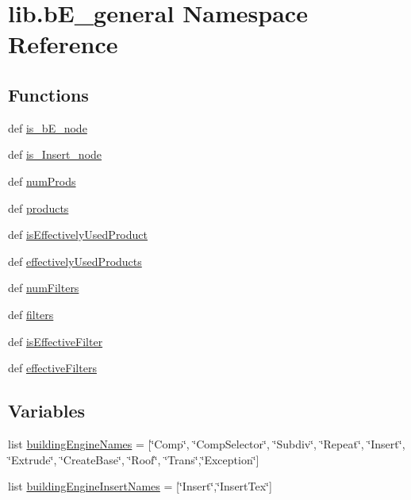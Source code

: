 \hypertarget{namespacelib_1_1b_e__general}{\section{lib.\-b\-E\-\_\-general Namespace Reference}
\label{namespacelib_1_1b_e__general}
}
\subsection*{Functions}
\begin{DoxyCompactItemize}
\item 
def \hyperlink{namespacelib_1_1b_e__general_a784331615caa27392dae5b2f06a7b300}{is\-\_\-b\-E\-\_\-node}
\item 
def \hyperlink{namespacelib_1_1b_e__general_a1c64670c6526440073513dcfa54629ee}{is\-\_\-\-Insert\-\_\-node}
\item 
def \hyperlink{namespacelib_1_1b_e__general_ae55ae717f583dfd2195236fccf88f3a5}{num\-Prods}
\item 
def \hyperlink{namespacelib_1_1b_e__general_a2022f99865d0b2ae4b0ee32877721599}{products}
\item 
def \hyperlink{namespacelib_1_1b_e__general_ab60f08564a37b0f64f8477332448eafb}{is\-Effectively\-Used\-Product}
\item 
def \hyperlink{namespacelib_1_1b_e__general_a79e6a9c95cca8ea0133a8cfdfa86df52}{effectively\-Used\-Products}
\item 
def \hyperlink{namespacelib_1_1b_e__general_af43f67c76b308bfa23de557b3df05037}{num\-Filters}
\item 
def \hyperlink{namespacelib_1_1b_e__general_a58df3146ff2a7326f1b5b4aaa6f2441e}{filters}
\item 
def \hyperlink{namespacelib_1_1b_e__general_ae854a33edae632b3c14ac5357c971f68}{is\-Effective\-Filter}
\item 
def \hyperlink{namespacelib_1_1b_e__general_a75f36a0c09ca3555258ece1373f9c2ae}{effective\-Filters}
\end{DoxyCompactItemize}
\subsection*{Variables}
\begin{DoxyCompactItemize}
\item 
list \hyperlink{namespacelib_1_1b_e__general_a85d4f42eb223bd1fdefcdb1b85074c9f}{building\-Engine\-Names} = \mbox{[}\char`\"{}Comp\char`\"{}, \char`\"{}Comp\-Selector\char`\"{}, \char`\"{}Subdiv\char`\"{}, \char`\"{}Repeat\char`\"{}, \char`\"{}Insert\char`\"{}, \char`\"{}Extrude\char`\"{}, \char`\"{}Create\-Base\char`\"{}, \char`\"{}Roof\char`\"{}, \char`\"{}Trans\char`\"{},\char`\"{}Exception\char`\"{}\mbox{]}
\item 
list \hyperlink{namespacelib_1_1b_e__general_a749122d14f45612af29898d4a1b2340f}{building\-Engine\-Insert\-Names} = \mbox{[}\char`\"{}Insert\char`\"{},\char`\"{}Insert\-Tex\char`\"{}\mbox{]}
\end{DoxyCompactItemize}


